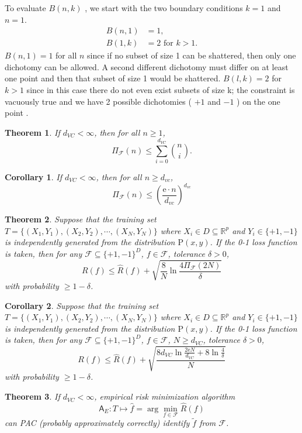 \documentclass{report}
\newtheorem{corollary}{Corollary}[chapter]
\newtheorem{theorem}{Theorem}[chapter]
\theoremstyle{nonumberplain}
\newcommand{\0}{\mathbf{0}}
\begin{document}
To evaluate $B(n, k)$ , we start with the two boundary conditions
$k = 1$ and $n = 1$.
\[
\begin{aligned} B(n, 1) &=1, \\
 B(1,k) &=2 \text { for } k>1. \end{aligned}
\]
$B(n,1) = 1$ for all $n$ since if no subset of size 1 can be shattered, then only one dichotomy can be allowed. A second different dichotomy must differ on at least one point and then that subset of size 1 would be shattered. $B(l,k) = 2$ for $k > 1$ since in this case there do not even exist subsets of size k; the constraint is vacuously true and we have 2 possible dichotomies ( $+1$ and $-1$ ) on the one point .
\begin{theorem}
	If $d_{VC}<\infty$, then for all $n\ge1$,
	\[
	\Pi_{\mathcal{F}}(n) \le \sum_{i=0}^{d_{VC}}\binom{n}{i}.
	\]
\end{theorem}

\begin{corollary}
	If $d_{VC}<\infty$, then for all $n\ge d_{vc}$,
	\[
	\Pi_{\mathcal{F}}(n) \le\left(\frac{\mathrm{e}\cdot n }{d_{vc}}\right)^{d_{vc}}
	\]
\end{corollary}
\begin{theorem}
Suppose that the training set $T=\{(X_1,Y_1),(X_2,Y_2),\cdots,(X_{N},Y_{N})\}$ where $X_i\in D\subseteq\mathbb{R}^p$ and $Y_i\in\{+1,-1\}$ is  independently generated from the distribution $\mathrm{P}(x,y)$. If the 0-1 loss function is taken, then for any $\mathcal{F}\subseteq\{+1,-1\}^D$, $f\in\mathcal{F}$, tolerance $\delta > 0$,
\[
R(f) \le \widehat{R}(f)+\sqrt{\frac{8}{N} \ln \frac{4 \Pi_{\mathcal{F}}(2N)}{\delta}}
\]
with probability $\ge 1-\delta$.
\end{theorem}
\begin{corollary}
	Suppose that the training set $T=\{(X_1,Y_1),(X_2,Y_2),\cdots,(X_{N},Y_{N})\}$ where $X_i\in D\subseteq\mathbb{R}^p$ and $Y_i\in\{+1,-1\}$ is  independently generated from the distribution $\mathrm{P}(x,y)$. If the 0-1 loss function is taken, then for any $\mathcal{F}\subseteq\{+1,-1\}^D$, $f\in\mathcal{F}$, $N\ge d_{VC}$, tolerance $\delta > 0$,
	\[
	R(f) \le \widehat{R}(f)+\sqrt{\frac{8 d_{VC} \ln \frac{2 \mathrm{e} N}{d_{VC}}+8 \ln \frac{4}{\delta}}{N}}
	\]
	with probability $\ge 1-\delta$.
\end{corollary}

\begin{theorem}
	If $d_{VC}<\infty$, empirical risk minimization algorithm 
	$$\mathsf{A}_E:T\longmapsto \hat{f}=\arg\min_{f\in\mathcal{F}}\widehat{R}(f) $$
	can PAC (probably approximately correctly) identify $\tilde{f}$ from $\mathcal{F}$.
\end{theorem}
\end{document}
